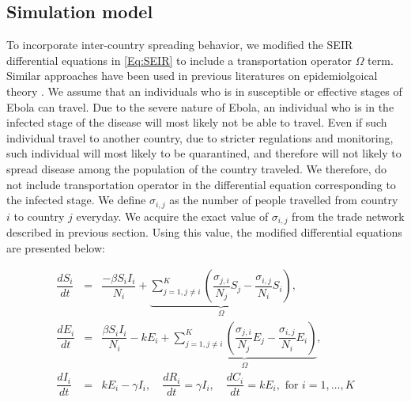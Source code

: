 \documentclass[10pt, journal,onecolumn]{IEEEtran}
\begin{document}
\subsection*{\textbf{Simulation model}}

To incorporate inter-country spreading behavior, we modified the SEIR differential equations in \eqref{Eq:SEIR} to include a transportation operator $\Omega$ term. Similar approaches have been used in previous literatures on epidemiolgoical theory \citep{grais2003assessing, balcan2010modeling}. We assume that an individuals who is in susceptible or effective stages of Ebola can travel. Due to the severe nature of Ebola, an individual who is in the infected stage of the disease will most likely not be able to travel. Even if such individual travel to another country, due to stricter regulations and monitoring, such individual will most likely to be quarantined, and therefore will not likely to spread disease among the population of the country traveled. We therefore, do not  include transportation operator in the differential equation corresponding to the infected stage. We define $\sigma_{i,j}$ as the number of people travelled from country $i$ to country $j$ everyday. We acquire the exact value of  $\sigma_{i,j}$ from the trade network described in previous section.  Using this value, the modified differential equations are presented below:

\begin{eqnarray}
\dfrac{dS_{i}}{dt}&=&\dfrac{-\beta S_{i}I_{i}}{N_{i}}+\underset{\Omega}{\underbrace{\sum_{j=1,j\neq i}^{K}\left(\dfrac{\sigma_{j,i}}{N_{j}}S_{j}-\dfrac{\sigma_{i,j}}{N_{i}}S_{i}\right)}},\nonumber \\
\dfrac{dE_{i}}{dt}&=&\dfrac{\beta S_{i}I_{i}}{N_{i}}-kE_{i}+\underset{\Omega}{\underbrace{\sum_{j=1,j\neq i}^{K}\left(\dfrac{\sigma_{j,i}}{N_{j}}E_{j}-\dfrac{\sigma_{i,j}}{N_{i}}E_{i}\right)}},\nonumber \\
\dfrac{dI_{i}}{dt}&=& kE_{i}-\gamma I_{i},
\quad
\dfrac{dR_i}{dt}	=	\gamma I_i,
\quad
\dfrac{dC_i}{dt}	=	kE_i, \text{  for } i=1,\ldots, K
\label{Eq:SEIR_world}
\end{eqnarray}
\end{document}

